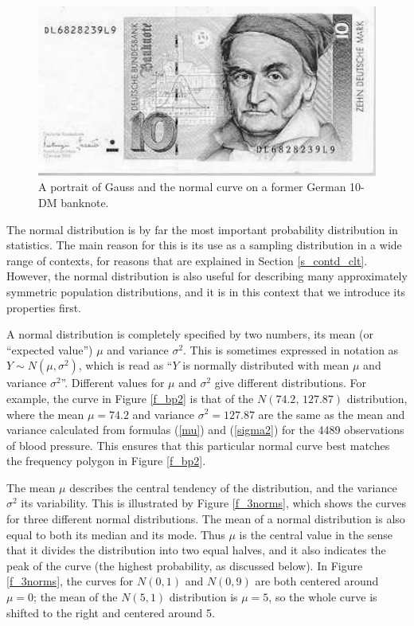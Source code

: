 \begin{figure}
\caption{A portrait of Gauss and the normal curve on a former German
10-DM banknote.}
\label{f_10dm}
\includegraphics[width=14cm]{mark}
\end{figure}

The normal distribution is by far the most important probability
distribution in statistics. The main reason for this is its use as a
sampling distribution in a wide range of contexts, for reasons that are
explained in Section \ref{s_contd_clt}. However, the normal distribution
is also useful for describing many approximately symmetric population
distributions, and it is in this context that we introduce its
properties first.

A normal distribution is completely specified by two
numbers, its mean (or ``expected value'') $\mu$ and variance $\sigma^{2}$. This is
sometimes expressed in notation as $Y\sim N(\mu, \sigma^{2})$, which is read
as ``$Y$ is normally distributed with mean $\mu$ and variance
$\sigma^{2}$''. Different values for $\mu$ and $\sigma^{2}$ give
different distributions. For example, the curve in Figure \ref{f_bp2} is
that of the $N(74.2, \, 127.87)$ distribution, where the mean $\mu=74.2$
and variance $\sigma^{2}=127.87$ are the same as the mean
and variance calculated from formulas (\ref{mu}) and (\ref{sigma2}) for
the 4489 observations of blood pressure. This ensures that this
particular normal curve best matches the frequency polygon in Figure \ref{f_bp2}.

The mean $\mu$ describes the central tendency of the
distribution, and the variance $\sigma^{2}$ its variability. This is
illustrated by Figure \ref{f_3norms}, which shows the curves for three
different normal distributions. The mean of a normal distribution is
also equal to both its median and its mode. Thus $\mu$ is the central
value in the sense that it divides the distribution into two equal
halves, and it also indicates the peak of the curve (the highest
probability, as discussed below). In Figure \ref{f_3norms}, the curves
for $N(0, 1)$ and $N(0, 9)$ are both centered around $\mu=0$; the mean
of the $N(5, 1)$ distribution is $\mu=5$, so the whole curve is shifted
to the right and centered around 5.

